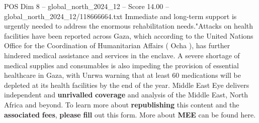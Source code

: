\begin{textsample}{POS Dim 8 – global\_north\_2024\_12 – Score 14.00 – global\_north\_2024\_12/118666664.txt}
Immediate and long-term support is urgently needed to address the enormous rehabilitation needs."Attacks on health facilities have been reported across Gaza, which according to the United Nations Office for the Coordination of Humanitarian Affairs ( Ocha ), has further hindered medical assistance and services in the enclave.
A severe shortage of medical supplies and consumables is also impeding the provision of essential healthcare in Gaza, with Unrwa warning that at least 60 medications will be depleted at its health facilities by the end of the year.
Middle East Eye delivers independent and \textbf{unrivalled} \textbf{coverage} and analysis of the Middle East, North Africa and beyond.
To learn more about \textbf{republishing} this content and the \textbf{associated} \textbf{fees}, \textbf{please} \textbf{fill} out this form.
More about \textbf{MEE} can be found here.

\end{textsample}
